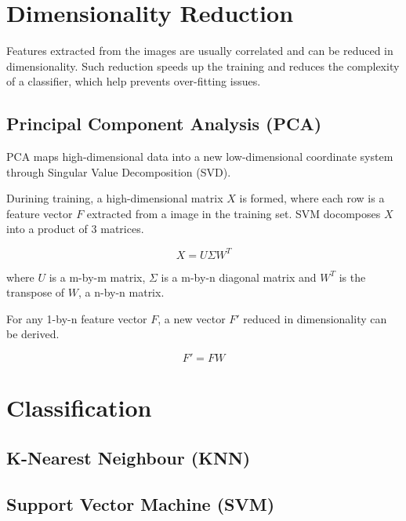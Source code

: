 \section{Dimensionality Reduction}
Features extracted from the images are usually correlated and can be reduced in dimensionality.
Such reduction speeds up the training and reduces the complexity of a classifier, which help prevents over-fitting issues.

\subsection{Principal Component Analysis (PCA)}
PCA maps high-dimensional data into a new low-dimensional coordinate system through Singular Value Decomposition (SVD).

Durining training, a high-dimensional matrix $X$ is formed, where each row is a feature vector $F$ extracted from a image in the training set.
SVM docomposes $X$ into a product of $3$ matrices.

\begin{equation}
X = U \Sigma W^T
\end{equation}

where $U$ is a m-by-m matrix, $\Sigma$ is a m-by-n diagonal matrix and $W^T$ is the transpose of $W$, a n-by-n matrix.

For any 1-by-n feature vector $F$, a new vector $F'$ reduced in dimensionality can be derived.

\begin{equation}
F' = FW
\end{equation}

\section{Classification}

\subsection{K-Nearest Neighbour (KNN)}

\subsection{Support Vector Machine (SVM)}



